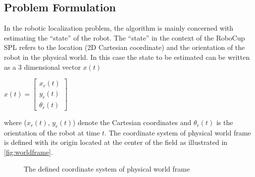 \subsection{Problem Formulation}\label{sub:problem}
In the robotic localization problem, the algorithm is mainly concerned with estimating the ``state'' of the robot. The ``state'' in the context of the RoboCup \gls{SPL} refers to the location (2D Cartesian coordinate) and the orientation of the robot in the physical world. In this case the state to be estimated can be written as a 3 dimensional vector $x(t)$
\begin{center}
$x(t) =
 \begin{bmatrix}
  x_{r}(t) \\
  y_{r}(t) \\
  \theta_{r}(t) 
 \end{bmatrix} $ \\
\end{center}
where ($x_{r}(t)$, $y_{r}(t)$) denote the Cartesian coordinates and $\theta_{r}(t)$ is the orientation of the robot at time $t$. The coordinate system of physical world frame is defined with its origin located at the center of the field as illustrated in \autoref{fig:worldframe}.
\begin{figure}[h]
  \centering
  \caption{The defined coordinate system of physical world frame}
  \label{fig:worldframe}
\end{figure}

